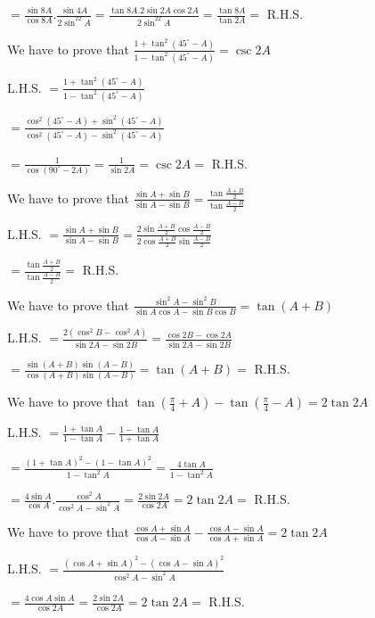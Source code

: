   $= \frac{\sin8A}{\cos8A}.\frac{\sin4A}{2\sin^22A} = \frac{\tan8A. 2\sin2A\cos2A}{2\sin^22A} = \frac{\tan8A}{\tan2A} =$
  R.H.S.

\item We have to prove that $\frac{1 + \tan^2(45^\circ - A)}{1 - \tan^2(45^\circ - A)} = \csc 2A$

  L.H.S. $= \frac{1 + \tan^2(45^\circ - A)}{1 - \tan^2(45^\circ - A)}$

  $= \frac{\cos^2(45^\circ - A) + \sin^2(45^\circ - A)}{\cos^2(45^\circ - A) - \sin^2(45^\circ - A)}$

  $= \frac{1}{\cos(90^\circ - 2A)} = \frac{1}{\sin2A} = \csc2A =$ R.H.S.

\item We have to prove that $\frac{\sin A + \sin B}{\sin A - \sin B} = \frac{\tan \frac{A + B}{2}}{\tan \frac{A - B}{2}}$

  L.H.S. $= \frac{\sin A + \sin B}{\sin A - \sin B} = \frac{2\sin\frac{A + B}{2}\cos\frac{A - B}{2}}{2\cos\frac{A +
      B}{2}\sin\frac{A - B}{2}}$

  $= \frac{\tan \frac{A + B}{2}}{\tan \frac{A - B}{2}} =$ R.H.S.

\item We have to prove that $\frac{\sin^2A - \sin^2B}{\sin A\cos A - \sin B\cos B} = \tan(A + B)$

  L.H.S. $= \frac{2(\cos^2B - \cos^2A)}{\sin2A - \sin2B} = \frac{\cos2B - \cos2A}{\sin2A - \sin2B}$

  $= \frac{\sin(A + B)\sin(A - B)}{\cos(A + B)\sin(A - B)} = \tan(A + B) =$ R.H.S.

\item We have to prove that $\tan\left(\frac{\pi}{4} + A\right) - \tan\left(\frac{\pi}{4} - A\right) = 2\tan 2A$

  L.H.S. $= \frac{1 + \tan A}{1 - \tan A} - \frac{1 - \tan A}{1 + \tan A}$

  $= \frac{(1 + \tan A)^2 - (1 - \tan A)^2}{1 - \tan^2A} = \frac{4\tan A}{1 - \tan^2A}$

  $= \frac{4\sin A}{\cos A}. \frac{\cos^2A}{\cos^2A - \sin^2A} = \frac{2\sin2A}{\cos2A} = 2\tan2A =$ R.H.S.

\item We have to prove that $\frac{\cos A + \sin A}{\cos A - \sin A} - \frac{\cos A - \sin A}{\cos A + \sin A} = 2\tan 2A$

  L.H.S. $= \frac{(\cos A + \sin A)^2 - (\cos A - \sin A)^2}{\cos^2A - \sin^2A}$

  $= \frac{4\cos A\sin A}{\cos 2A} = \frac{2\sin 2A}{\cos 2A} = 2\tan2A =$ R.H.S.

